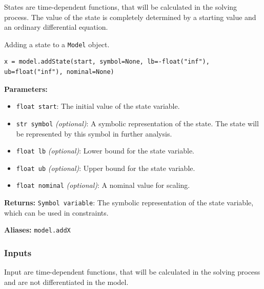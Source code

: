 \documentclass[12pt]{article}
\begin{document}
	States are time-dependent functions, that will be calculated in the solving process. The value of the state is completely determined by a starting value and an ordinary differential equation.
	
	
\begin{mdframed}[backgroundcolor=gray!10, roundcorner=10pt, linewidth=1pt]
	
	Adding a state to a \texttt{Model} object.
	
	\begin{lstlisting}
x = model.addState(start, symbol=None, lb=-float("inf"), ub=float("inf"), nominal=None)
	\end{lstlisting}

	\textbf{Parameters:}
	\begin{itemize}
		\item \texttt{float start}: The initial value of the state variable.
		\item \texttt{str symbol} \emph{(optional)}: A symbolic representation of the state. The state will be represented by this symbol in further analysis.
		\item \texttt{float lb} \emph{(optional)}: Lower bound for the state variable.
		\item \texttt{float ub} \emph{(optional)}: Upper bound for the state variable.
		\item \texttt{float nominal} \emph{(optional)}: A nominal value for scaling.
	\end{itemize}
	
	\textbf{Returns:} 
	\texttt{Symbol variable}: The symbolic representation of the state variable, which can be used in constraints.
	
	\textbf{Aliases:} \texttt{model.addX}
\end{mdframed}


	\subsubsection{Inputs}
	
	Input are time-dependent functions, that will be calculated in the solving process and are not differentiated in the model.
	
\end{document}
